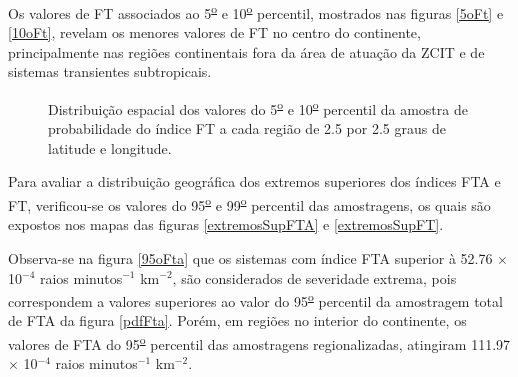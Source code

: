 Os valores de FT associados ao 5\textsuperscript{\underline{o}} e 10\textsuperscript{\underline{o}} percentil, mostrados nas figuras \ref{5oFt} e \ref{10oFt}, revelam os menores valores de FT no centro do continente, principalmente nas regiões continentais fora da área de atuação da ZCIT e de sistemas transientes subtropicais.

\begin{figure}[!ht]
  \caption{Distribuição espacial dos valores do 5\textsuperscript{\underline{o}} e 10\textsuperscript{\underline{o}} percentil da amostra de probabilidade do índice FT a cada região de 2.5 por 2.5 graus de latitude e longitude.}
\label{extremosInfFT}
\end{figure} 

Para avaliar a distribuição geográfica dos extremos superiores dos índices FTA e FT, verificou-se os valores do 95\textsuperscript{\underline{o}} e 99\textsuperscript{\underline{o}} percentil das amostragens, os quais são expostos nos mapas das figuras \ref{extremosSupFTA} e \ref{extremosSupFT}.


Observa-se na figura \ref{95oFta} que os sistemas com índice FTA  superior à 52.76 $\times$ 10$^{-4}$ raios minutos$^{-1}$
km$^{-2}$, são considerados de severidade extrema, pois correspondem a valores superiores ao valor do 95\textsuperscript{\underline{o}} percentil da amostragem total de FTA da figura \ref{pdfFta}. Porém, em regiões no interior do continente, os valores de FTA do 95\textsuperscript{\underline{o}} percentil das amostragens regionalizadas, atingiram  111.97 $\times$ 10$^{-4}$ raios minutos$^{-1}$ km$^{-2}$.

